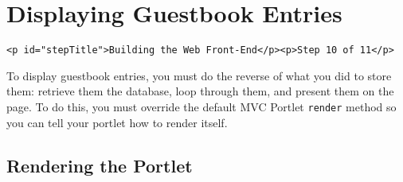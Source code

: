\chapter{Displaying Guestbook
Entries}\label{displaying-guestbook-entries}

\begin{verbatim}
<p id="stepTitle">Building the Web Front-End</p><p>Step 10 of 11</p>
\end{verbatim}

To display guestbook entries, you must do the reverse of what you did to
store them: retrieve them the database, loop through them, and present
them on the page. To do this, you must override the default MVC Portlet
\texttt{render} method so you can tell your portlet how to render
itself.

\section{Rendering the Portlet}\label{rendering-the-portlet}

